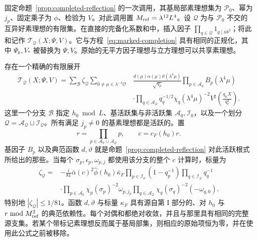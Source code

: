 \begin{corollary}[带整指标标记的完备化反射]
\label{cor:marked-reflection}
固定命题~\ref{prop:completed-reflection} 的一次调用，其基局部素理想集为 \(\mathcal P_0\)、幂为 \(j_p\)、固定乘子为 \(\phi\)、检验为 \(V\)。对此调用置 \(M_{\rm ref}=\lambda^{12}L^4\)。设 \(\mathcal Q\) 为与 \(\mathcal P_0\) 不交的互异好素理想的有限集。在直接的完备化系数和中，插入因子 \(\prod_{q\in\mathcal Q}1_{q\mid nb^3}\)；将此和记作 \(\mathcal T_{\mathcal Q}(X;\Psi,V)\)。它与方程~\eqref{eq:marked-completion} 具有相同的正规化，其中 \(\Psi_k,V_*\) 被替换为 \(\Psi,V\)。原始的无平方因子理想与立方理想可以共享素理想。

存在一个精确的有限展开
\begin{equation}\label{eq:marked-reflection}
 \begin{split}
 \mathcal T_{\mathcal Q}(X;\Psi,V)
 =\sum_{\mathcal B}\zeta_{\mathcal Q}
 \sum_{0\ne\mu\in\lambda^{-4}\mathcal O}
 &\frac{d(\mu)\alpha(\mu)\vartheta(\lambda^4\mu)}{\sqrt{q_\mu}}
 \prod_{p\in\mathcal A_0}B_p(\lambda^4\mu)\\
 &\cdot\prod_{q\in\mathcal A_{\mathcal Q}}
       q_q^{-1/2}\chi_q(\lambda^4\mu)^{-2}
 V^\sharp\!\left(\frac{q_\mu X}{q_c^2}\right).
 \end{split}
\end{equation}
这里一个分支 \(\mathcal B\) 指定 \(h_0\bmod L\)、基活跃集与非活跃集 \(\mathcal A_0,\mathcal I_0\)，以及一个划分 \(\mathcal Q=\mathcal A_{\mathcal Q}\sqcup\mathcal I_{\mathcal Q}\)。所有满足 \(j_p\ne0\) 的基素理想都是活跃的。置
\[
 r=\prod_{p\in\mathcal A_0\cup\mathcal A_{\mathcal Q}}p,
 \qquad c=c_F(h_0)r.
\]
基因子 \(B_p\) 以及典范函数 \(d,\vartheta\) 就是命题~\ref{prop:completed-reflection} 对此活跃根式所给出的那些。当每个 \(\sigma_p,\epsilon_p,\omega_{p,j}\) 都使用该分支的整个 \(c\) 计算时，标量为
\begin{equation}\label{eq:marked-reflection-phase}
 \begin{split}
 \zeta_{\mathcal Q}={}&-\frac{i}{81}\bar\alpha(c)^2
       \widehat\phi(h_0)\bar\kappa_F
       \prod_{p\in\mathcal I_0}(1-q_p^{-1})
       \prod_{q\in\mathcal I_{\mathcal Q}}q_q^{-1}\\
 &\cdot\prod_{p\in\mathcal A_0}\chi_p(\sigma_p)^{-2}\omega_{p,j_p}
       \prod_{q\in\mathcal A_{\mathcal Q}}
             \chi_q(\sigma_q)^{-2}(-\omega_{q,0}).
 \end{split}
\end{equation}
特别地 \(|\zeta_{\mathcal Q}|\le1/81\)。函数 \(d,\vartheta\) 与标量 \(\kappa_F\) 具有源自第 I 部分的、对 \(h_0\) 与 \(r\bmod M_{\rm ref}^2\) 的典范依赖性。每个对偶和都绝对收敛，并且与那里具有相同的完整源支集。若某个带标记素理想反而属于基局部集，则相应的原始项恒为零，并在使用此公式之前被移除。
\end{corollary}

